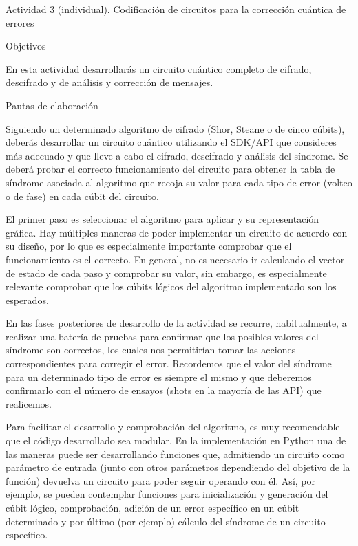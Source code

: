 Actividad 3 (individual). Codificación de circuitos para la corrección cuántica de errores

Objetivos 

En esta actividad desarrollarás un circuito cuántico completo de cifrado, descifrado y de análisis y corrección de mensajes.

Pautas de elaboración

Siguiendo un determinado algoritmo de cifrado (Shor, Steane o de cinco cúbits), deberás desarrollar un circuito cuántico utilizando el SDK/API que consideres más adecuado y que lleve a cabo el cifrado, descifrado y análisis del síndrome. Se deberá probar el correcto funcionamiento del circuito para obtener la tabla de síndrome asociada al algoritmo que recoja su valor para cada tipo de error (volteo o de fase) en cada cúbit del circuito.

El primer paso es seleccionar el algoritmo para aplicar y su representación gráfica. Hay múltiples maneras de poder implementar un circuito de acuerdo con su diseño, por lo que es especialmente importante comprobar que el funcionamiento es el correcto. En general, no es necesario ir calculando el vector de estado de cada paso y comprobar su valor, sin embargo, es especialmente relevante comprobar que los cúbits lógicos del algoritmo implementado son los esperados.

En las fases posteriores de desarrollo de la actividad se recurre, habitualmente, a realizar una batería de pruebas para confirmar que los posibles valores del síndrome son correctos, los cuales nos permitirían tomar las acciones correspondientes para corregir el error. Recordemos que el valor del síndrome para un determinado tipo de error es siempre el mismo y que deberemos confirmarlo con el número de ensayos (shots en la mayoría de las API) que realicemos.

Para facilitar el desarrollo y comprobación del algoritmo, es muy recomendable que el código desarrollado sea modular. En la implementación en Python una de las maneras puede ser desarrollando funciones que, admitiendo un circuito como parámetro de entrada (junto con otros parámetros dependiendo del objetivo de la función) devuelva un circuito para poder seguir operando con él. Así, por ejemplo, se pueden contemplar funciones para inicialización y generación del cúbit lógico, comprobación, adición de un error específico en un cúbit determinado y por último (por ejemplo) cálculo del síndrome de un circuito específico.
